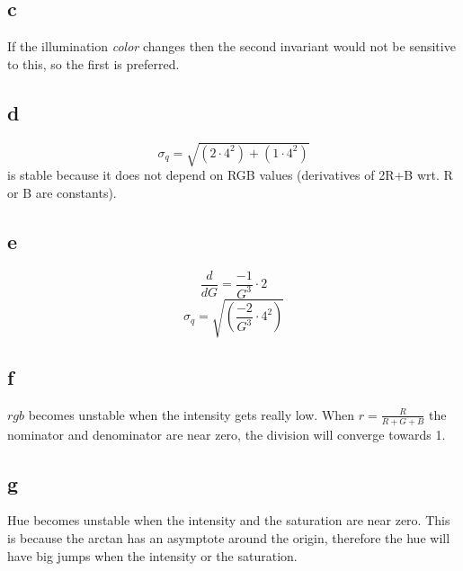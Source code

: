 \documentclass[a4paper,11pt]{article}
\begin{document}
		\subsection*{c}
			If the illumination \textit{color} changes then the second invariant would not
			be sensitive to this, so the first is preferred.

		\subsection*{d}
			\[\sigma_q = \sqrt{(2\cdot4^2)+(1\cdot4^2)}\] 
			is stable because it does not depend on RGB values (derivatives of 2R+B wrt. R or B are constants).
		\subsection*{e}
			\[\frac{d}{dG}=\frac{-1}{G^3}\cdot 2\]
			\[\sigma_q = \sqrt{(\frac{-2}{G^3}\cdot4^2)}\] 
		\subsection*{f}
			$rgb$ becomes unstable when the intensity gets really low. When $r=\frac{R}{R+G+B}$
			the nominator and denominator are near zero, the division will converge towards 1.
		\subsection*{g}
			Hue becomes unstable when the intensity and the saturation are near zero. This is
			because the arctan has an asymptote around the origin, therefore the hue will have
			big jumps when the intensity or the saturation.
\end{document}
